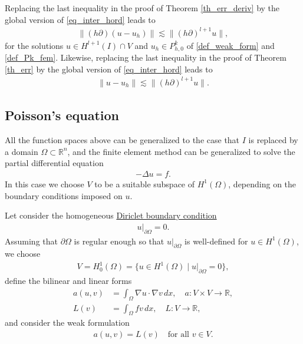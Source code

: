 \documentclass[12pt,oneside,final]{amsart}
\def\p{\partial}
\def\R{\mathbb R}
\begin{document}
Replacing the last inequality in the proof of Theorem \ref{th_err_deriv} by the global version of \eqref{eq_inter_hord}
leads to
    \begin{align*}
\|(h\partial)(u-u_h)\|
\lesssim
\|(h \partial)^{l+1} u\|,
    \end{align*}
for the solutions 
$u \in H^{l+1}(I) \cap V$ and $u_h \in P_{h,0}^k$ of \eqref{def_weak_form}
and \eqref{def_Pk_fem}. Likewise, replacing the last inequality in the proof of Theorem \ref{th_err} by the global version of \eqref{eq_inter_hord}
leads to
    \begin{align*}
\|u-u_h\|
\lesssim
\|(h \partial)^{l+1} u\|.
    \end{align*}

\subsection{Poisson's equation}

All the function spaces above can be generalized to the case that $I$ is replaced by a domain $\Omega \subset \R^n$,
and the finite element method can be generalized to solve the partial differential equation 
    \begin{align}\label{eq_poisson_nd}
- \Delta u = f.
    \end{align} 
In this case we choose $V$ to be a suitable subspace of $H^1(\Omega)$, depending on the boundary conditions imposed on $u$. 

Let consider the homogeneous \href{https://en.wikipedia.org/wiki/Dirichlet_boundary_condition}{Diriclet boundary condition}
    \begin{align}\label{eq_dirichlet}
u|_{\p \Omega} = 0.
    \end{align}
Assuming that $\p \Omega$ is regular enough so that $u|_{\p \Omega}$ is well-defined for $u \in H^1(\Omega)$, we choose
    \begin{align*}
V = H_0^1(\Omega) = \{u \in H^1(\Omega) \mid u|_{\p \Omega} = 0\},
    \end{align*} 
define the bilinear and linear forms 
    \begin{align*}
a(u,v) &= \int_\Omega \nabla u \cdot \nabla v\, dx,
\quad a : V \times V \to \R,
\\
L(v) &= \int_\Omega f v\, dx, \quad L : V \to \R,
    \end{align*}
and consider the weak formulation 
    \begin{align}\label{def_weak_nd}
a(u, v) = L(v) \quad \text{for all $v \in V$}.
    \end{align}
\end{document}
